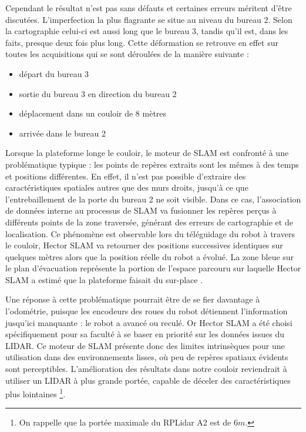   Cependant le résultat n'est pas sans défauts et certaines erreurs méritent d'être discutées. 
  L'imperfection la plus flagrante se situe au niveau du bureau 2. 
  Selon la cartographie celui-ci est aussi long que le bureau 3, tandis qu'il est, dans les faits, presque deux fois plus long. 
  Cette déformation se retrouve en effet sur toutes les acquisitions qui se sont déroulées de la manière suivante : 
  \begin{itemize}
   \item départ du bureau 3
   \item sortie du bureau 3 en direction du bureau 2
   \item déplacement dans un couloir de 8 mètres
   \item arrivée dans le bureau 2
  \end{itemize}

  Lorsque la plateforme longe le couloir, le moteur de SLAM est confronté à une problématique typique : les points de repères extraits sont les mêmes à des temps et positions différentes. 
  En effet, il n'est pas possible d'extraire des caractéristiques spatiales autres que des murs droits, jusqu'à ce que l'entrebaillement de la porte du bureau 2 ne soit visible. 
  Dans ce cas, l'association de données interne au processus de SLAM va fusionner les repères perçus à différents points de la zone traversée, générant des erreurs de cartographie et de localisation.  
  Ce phénomène est observable lors du téléguidage du robot à travers le couloir, \gls{Hector SLAM} va retourner des positions successives identiques sur quelques mètres alors que la position réelle du robot a évolué.
  La zone bleue sur le plan d'évacuation représente la portion de l'espace parcouru sur laquelle \gls{Hector SLAM} a estimé que la plateforme faisait du \og sur-place \fg{}. 
  
  Une réponse à cette problématique pourrait être de se fier davantage à l'odométrie, puisque les encodeurs des roues du robot détiennent l'information jusqu'ici manquante : le robot a avancé ou reculé. 
  Or Hector SLAM a été choisi spécifiquement pour sa faculté à se baser en priorité sur les données issues du LIDAR. 
  Ce moteur de SLAM présente donc des limites intrinsèques pour une utilisation dans des environnements lisses, où peu de repères spatiaux évidents sont perceptibles.  
  L'amélioration des résultats dans notre couloir reviendrait à utiliser un LIDAR à plus grande portée, capable de déceler des caractéristiques plus lointaines
  \footnote{On rappelle que la portée maximale du RPLidar A2 est de $6m$.}.
  
